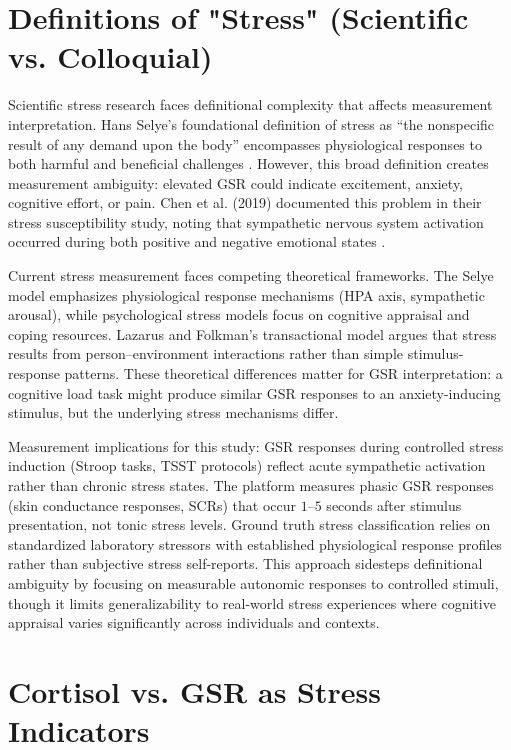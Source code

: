 \documentclass{report}
\begin{document}
    \section{Definitions of "Stress" (Scientific vs. Colloquial)}
    \label{sec:stress_definitions}

    Scientific stress research faces definitional complexity that affects measurement interpretation. Hans Selye's foundational definition of stress as ``the nonspecific result of any demand upon the body'' encompasses physiological responses to both harmful and beneficial challenges \cite{selye11}. However, this broad definition creates measurement ambiguity: elevated GSR could indicate excitement, anxiety, cognitive effort, or pain. Chen et al. (2019) documented this problem in their stress susceptibility study, noting that sympathetic nervous system activation occurred during both positive and negative emotional states \cite{chen2019}.

    Current stress measurement faces competing theoretical frameworks. The Selye model emphasizes physiological response mechanisms (HPA axis, sympathetic arousal), while psychological stress models focus on cognitive appraisal and coping resources. Lazarus and Folkman's transactional model argues that stress results from person--environment interactions rather than simple stimulus-response patterns. These theoretical differences matter for GSR interpretation: a cognitive load task might produce similar GSR responses to an anxiety-inducing stimulus, but the underlying stress mechanisms differ.

    Measurement implications for this study: GSR responses during controlled stress induction (Stroop tasks, TSST protocols) reflect acute sympathetic activation rather than chronic stress states. The platform measures phasic GSR responses (skin conductance responses, SCRs) that occur $1$--$5$ seconds after stimulus presentation, not tonic stress levels. Ground truth stress classification relies on standardized laboratory stressors with established physiological response profiles rather than subjective stress self-reports. This approach sidesteps definitional ambiguity by focusing on measurable autonomic responses to controlled stimuli, though it limits generalizability to real-world stress experiences where cognitive appraisal varies significantly across individuals and contexts.


    \section{Cortisol vs. GSR as Stress Indicators}
    \label{sec:cortisol_vs_gsr}
\end{document}

